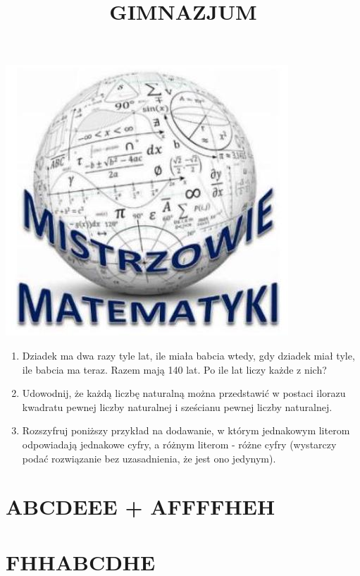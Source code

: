 \documentclass[10pt]{article}
\title{GIMNAZJUM }
\author{}
\date{}
\begin{document}
\maketitle
\begin{center}
\includegraphics[max width=\textwidth]{2024_11_21_02460cd11983fca8e306g-1}
\end{center}

\begin{enumerate}
  \item Dziadek ma dwa razy tyle lat, ile miała babcia wtedy, gdy dziadek miał tyle, ile babcia ma teraz. Razem mają 140 lat. Po ile lat liczy każde z nich?
  \item Udowodnij, że każdą liczbę naturalną można przedstawić w postaci ilorazu kwadratu pewnej liczby naturalnej i sześcianu pewnej liczby naturalnej.
  \item Rozszyfruj poniższy przykład na dodawanie, w którym jednakowym literom odpowiadają jednakowe cyfry, a różnym literom - różne cyfry (wystarczy podać rozwiązanie bez uzasadnienia, że jest ono jedynym).
\end{enumerate}

\section*{ABCDEEE + AFFFFHEH}
\section*{FHHABCDHE}
\end{document}
